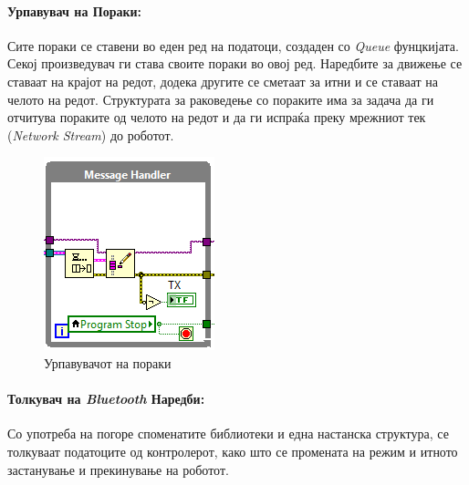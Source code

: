 \documentclass[12pt]{article}
\begin{document}
    \paragraph{Урпавувач на Пораки:\\} %
    \label{sec:message_handler}
    Сите пораки се ставени во еден ред на податоци, создаден со \textit{Queue} фунцкијата. Секој произведувач ги става своите пораки во овој ред. Наредбите за движење се ставаат на крајот на редот, додека другите се сметаат за итни и се ставаат на челото на редот. Структурата за раковедење со пораките има за задача да ги отчитува пораките од челото на редот и да ги испраќа преку мрежниот тек (\textit{Network Stream}) до роботот.
    \begin{figure}[H]
      \centering
      \includegraphics[width=0.5\linewidth]{./images/message_handler.PNG}
      \caption{Урпавувачот на пораки}
    \end{figure}

    \paragraph{Толкувач на \textit{Bluetooth} Наредби:\\}
      Со употреба на погоре споменатите библиотеки и една настанска структура, се толкуваат податоците од контролерот, како што се промената на режим и итното застанување и прекинување на роботот.
\end{document}
